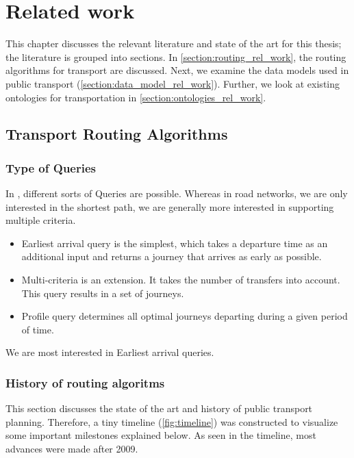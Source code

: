 \chapter{Related work}
\label{chap:rel_work}
This chapter discusses the relevant literature and state of the art for this thesis; the literature is grouped into  sections. In \autoref{section:routing_rel_work}, the routing algorithms for transport are discussed. Next, we examine the data models used in public transport (\autoref{section:data_model_rel_work}). Further, we look at existing ontologies for transportation in \autoref{section:ontologies_rel_work}.

\section{Transport Routing Algorithms }\label{section:routing_rel_work}

\subsection{Type of Queries}
In , different sorts of Queries are possible. Whereas in road networks, we are only interested in the shortest path, we are generally more interested in supporting multiple criteria. 
\begin{itemize}
    \item Earliest arrival query is the simplest, which takes a departure time as an additional input and returns a journey that arrives as early as possible.
    \item Multi-criteria is an extension. It takes the number of transfers into account. This query results in a set of journeys.
    \item Profile query determines all optimal journeys departing during a given period of time.
\end{itemize}

We are most interested in Earliest arrival queries.
\subsection{History of routing algoritms}


This section discusses the state of the art and history of public transport planning. Therefore, a tiny timeline (\autoref{fig:timeline}) was constructed to visualize some important milestones explained below. As seen in the timeline, most advances were made after 2009.

